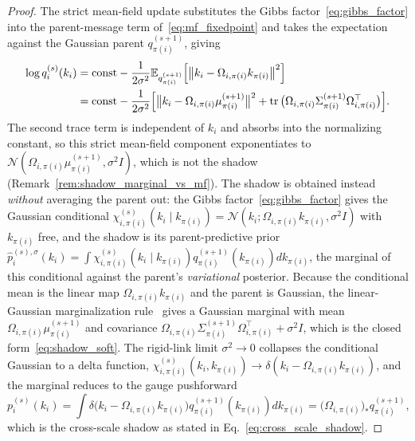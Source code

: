 \documentclass[11pt]{article}
\begin{document}
\begin{proof}
The strict mean-field update substitutes the Gibbs factor~\eqref{eq:gibbs_factor} into the parent-message term of~\eqref{eq:mf_fixedpoint} and takes the expectation against the Gaussian parent $q_{\pi(i)}^{(s+1)}$, giving
\begin{align}
\log q_i^{(s)}(k_i) &= \text{const} - \frac{1}{2\sigma^2} \mathbb{E}_{q_{\pi(i)}^{(s+1)}}\Big[\big\|k_i - \Omega_{i,\pi(i)} k_{\pi(i)}\big\|^2\Big] \notag\\
&= \text{const} - \frac{1}{2\sigma^2}\Big[\big\|k_i - \Omega_{i,\pi(i)}\mu_{\pi(i)}^{(s+1)}\big\|^2 + \operatorname{tr}\big(\Omega_{i,\pi(i)}\Sigma_{\pi(i)}^{(s+1)}\Omega_{i,\pi(i)}^\top\big)\Big].
\end{align}
The second trace term is independent of $k_i$ and absorbs into the normalizing constant, so this strict mean-field component exponentiates to $\mathcal{N}(\Omega_{i,\pi(i)}\mu_{\pi(i)}^{(s+1)}, \sigma^2 I)$, which is not the shadow (Remark~\ref{rem:shadow_marginal_vs_mf}). The shadow is obtained instead \emph{without} averaging the parent out: the Gibbs factor~\eqref{eq:gibbs_factor} gives the Gaussian conditional $\chi_{i,\pi(i)}^{(s)}(k_i \mid k_{\pi(i)}) = \mathcal{N}(k_i; \Omega_{i,\pi(i)} k_{\pi(i)}, \sigma^2 I)$ with $k_{\pi(i)}$ free, and the shadow is its parent-predictive prior $\hat{p}_i^{(s),\sigma}(k_i) = \int \chi_{i,\pi(i)}^{(s)}(k_i \mid k_{\pi(i)})  q_{\pi(i)}^{(s+1)}(k_{\pi(i)})  dk_{\pi(i)}$, the marginal of this conditional against the parent's \emph{variational} posterior. Because the conditional mean is the linear map $\Omega_{i,\pi(i)} k_{\pi(i)}$ and the parent is Gaussian, the linear-Gaussian marginalization rule~\cite[\S2.3.3]{Bishop2006} gives a Gaussian marginal with mean $\Omega_{i,\pi(i)}\mu_{\pi(i)}^{(s+1)}$ and covariance $\Omega_{i,\pi(i)}\Sigma_{\pi(i)}^{(s+1)}\Omega_{i,\pi(i)}^\top + \sigma^2 I$, which is the closed form~\eqref{eq:shadow_soft}. The rigid-link limit $\sigma^2 \to 0$ collapses the conditional Gaussian to a delta function, $\chi_{i,\pi(i)}^{(s)}(k_i, k_{\pi(i)}) \to \delta(k_i - \Omega_{i,\pi(i)} k_{\pi(i)})$, and the marginal reduces to the gauge pushforward
\begin{equation}
p_i^{(s)}(k_i)  =  \int \delta\big(k_i - \Omega_{i,\pi(i)} k_{\pi(i)}\big) q_{\pi(i)}^{(s+1)}(k_{\pi(i)})  dk_{\pi(i)}  =  \big(\Omega_{i,\pi(i)}\big)_* q_{\pi(i)}^{(s+1)},
\end{equation}
which is the cross-scale shadow as stated in Eq.~\eqref{eq:cross_scale_shadow}.
\end{proof}
\end{document}
